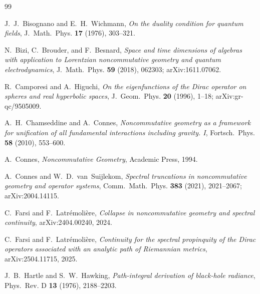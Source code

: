 \documentclass[11pt,a4paper]{article}
\theoremstyle{plain}
\theoremstyle{definition}
\begin{document}

\begin{thebibliography}{99}

J.~J.~Bisognano and E.~H.~Wichmann,
\newblock \emph{On the duality condition for quantum fields},
\newblock J.~Math.~Phys. \textbf{17} (1976), 303--321.

N.~Bizi, C.~Brouder, and F.~Besnard,
\newblock \emph{Space and time dimensions of algebras with
application to Lorentzian noncommutative geometry and quantum
electrodynamics},
\newblock J.~Math.~Phys. \textbf{59} (2018), 062303;
\newblock arXiv:1611.07062.

R.~Camporesi and A.~Higuchi,
\newblock \emph{On the eigenfunctions of the Dirac operator on
spheres and real hyperbolic spaces},
\newblock J.~Geom.~Phys. \textbf{20} (1996), 1--18;
\newblock arXiv:gr-qc/9505009.

A.~H.~Chamseddine and A.~Connes,
\newblock \emph{Noncommutative geometry as a framework for
unification of all fundamental interactions including gravity. I},
\newblock Fortsch.~Phys. \textbf{58} (2010), 553--600.

A.~Connes,
\newblock \emph{Noncommutative Geometry},
\newblock Academic Press, 1994.

A.~Connes and W.~D.~van~Suijlekom,
\newblock \emph{Spectral truncations in noncommutative geometry and
operator systems},
\newblock Comm.~Math.~Phys. \textbf{383} (2021), 2021--2067;
\newblock arXiv:2004.14115.

C.~Farsi and F.~Latr\'emoli\`ere,
\newblock \emph{Collapse in noncommutative geometry and spectral
continuity},
\newblock arXiv:2404.00240, 2024.

C.~Farsi and F.~Latr\'emoli\`ere,
\newblock \emph{Continuity for the spectral propinquity of the
Dirac operators associated with an analytic path of Riemannian
metrics},
\newblock arXiv:2504.11715, 2025.

J.~B.~Hartle and S.~W.~Hawking,
\newblock \emph{Path-integral derivation of black-hole radiance},
\newblock Phys.~Rev. D \textbf{13} (1976), 2188--2203.


\end{thebibliography}
\end{document}
